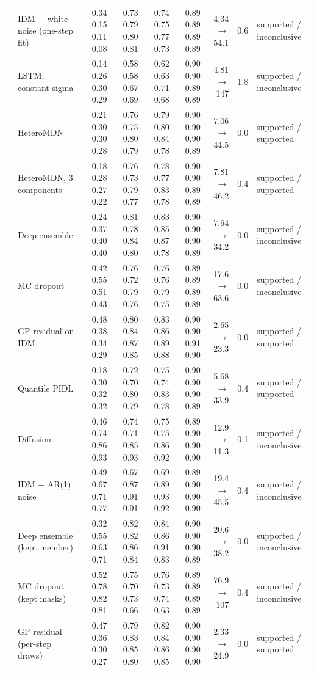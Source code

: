 \begin{longtable}{llrrrrrrl}
 & IDM + white noise (one-step fit) & 0.34 0.15 0.11 0.08 & 0.73 0.79 0.80 0.81 & 0.74 0.75 0.77 0.73 & 0.89 0.89 0.89 0.89 & 4.34 $\rightarrow$ 54.1 & 0.6 & supported / inconclusive \\
 & LSTM, constant sigma & 0.14 0.26 0.30 0.29 & 0.58 0.58 0.67 0.69 & 0.62 0.63 0.71 0.68 & 0.90 0.90 0.89 0.89 & 4.81 $\rightarrow$ 147 & 1.8 & supported / inconclusive \\
 & HeteroMDN & 0.21 0.30 0.30 0.28 & 0.76 0.75 0.80 0.79 & 0.79 0.80 0.84 0.78 & 0.90 0.90 0.90 0.89 & 7.06 $\rightarrow$ 44.5 & 0.0 & supported / supported \\
 & HeteroMDN, 3 components & 0.18 0.28 0.27 0.22 & 0.76 0.73 0.79 0.77 & 0.78 0.77 0.83 0.78 & 0.90 0.90 0.89 0.89 & 7.81 $\rightarrow$ 46.2 & 0.4 & supported / supported \\
 & Deep ensemble & 0.24 0.37 0.40 0.40 & 0.81 0.78 0.84 0.80 & 0.83 0.85 0.87 0.78 & 0.90 0.90 0.90 0.89 & 7.64 $\rightarrow$ 34.2 & 0.0 & supported / inconclusive \\
 & MC dropout & 0.42 0.55 0.51 0.43 & 0.76 0.72 0.79 0.76 & 0.76 0.76 0.79 0.75 & 0.89 0.89 0.89 0.89 & 17.6 $\rightarrow$ 63.6 & 0.0 & supported / inconclusive \\
 & GP residual on IDM & 0.48 0.38 0.34 0.29 & 0.80 0.84 0.87 0.85 & 0.83 0.86 0.89 0.88 & 0.90 0.90 0.91 0.90 & 2.65 $\rightarrow$ 23.3 & 0.0 & supported / supported \\
 & Quantile PIDL & 0.18 0.30 0.32 0.32 & 0.72 0.70 0.80 0.79 & 0.75 0.74 0.83 0.78 & 0.90 0.90 0.90 0.89 & 5.68 $\rightarrow$ 33.9 & 0.4 & supported / supported \\
 & Diffusion & 0.46 0.74 0.86 0.93 & 0.74 0.71 0.85 0.93 & 0.75 0.75 0.86 0.92 & 0.89 0.90 0.90 0.90 & 12.9 $\rightarrow$ 11.3 & 0.1 & supported / inconclusive \\
 & IDM + AR(1) noise & 0.49 0.67 0.71 0.77 & 0.67 0.87 0.91 0.91 & 0.69 0.89 0.93 0.92 & 0.89 0.90 0.90 0.90 & 19.4 $\rightarrow$ 45.5 & 0.4 & supported / inconclusive \\
 & Deep ensemble (kept member) & 0.32 0.55 0.63 0.71 & 0.82 0.82 0.86 0.84 & 0.84 0.86 0.91 0.83 & 0.90 0.90 0.90 0.89 & 20.6 $\rightarrow$ 38.2 & 0.0 & supported / inconclusive \\
 & MC dropout (kept masks) & 0.52 0.78 0.82 0.81 & 0.75 0.70 0.73 0.66 & 0.76 0.73 0.74 0.63 & 0.89 0.89 0.89 0.89 & 76.9 $\rightarrow$ 107 & 0.4 & supported / inconclusive \\
 & GP residual (per-step draws) & 0.47 0.36 0.30 0.27 & 0.79 0.83 0.85 0.80 & 0.82 0.84 0.86 0.85 & 0.90 0.90 0.90 0.90 & 2.33 $\rightarrow$ 24.9 & 0.0 & supported / supported \\
\end{longtable}
\endgroup
